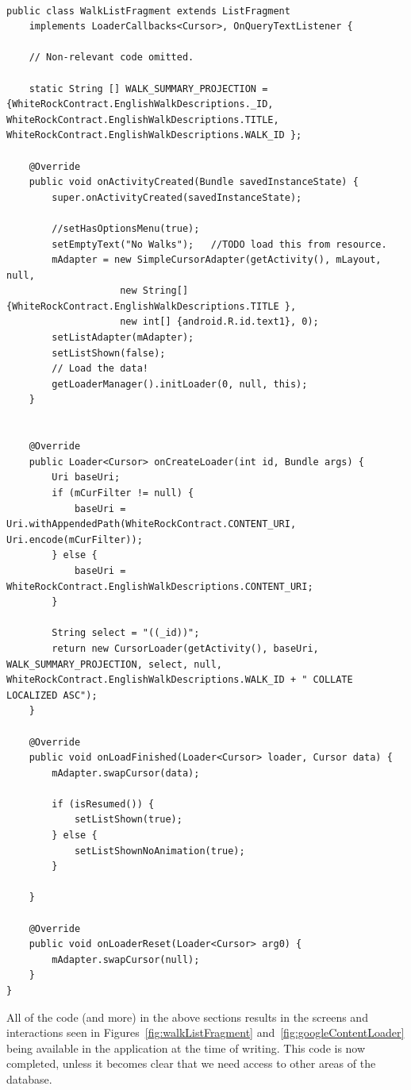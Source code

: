 \documentclass[11pt,a4paper]{article}
\begin{document}
\begin{lstlisting}[captionpos=b, caption=WalkListFragment Snippet, label=lst:walkListFragment, frame=single]

public class WalkListFragment extends ListFragment
	implements LoaderCallbacks<Cursor>, OnQueryTextListener {

	// Non-relevant code omitted.

	static String [] WALK_SUMMARY_PROJECTION = {WhiteRockContract.EnglishWalkDescriptions._ID, WhiteRockContract.EnglishWalkDescriptions.TITLE, WhiteRockContract.EnglishWalkDescriptions.WALK_ID };

	@Override
	public void onActivityCreated(Bundle savedInstanceState) {
		super.onActivityCreated(savedInstanceState);

		//setHasOptionsMenu(true);
		setEmptyText("No Walks");	//TODO load this from resource.
		mAdapter = new SimpleCursorAdapter(getActivity(), mLayout, null,
					new String[] {WhiteRockContract.EnglishWalkDescriptions.TITLE },
					new int[] {android.R.id.text1}, 0);
		setListAdapter(mAdapter);
		setListShown(false);
		// Load the data!
		getLoaderManager().initLoader(0, null, this);
	}


	@Override
	public Loader<Cursor> onCreateLoader(int id, Bundle args) {
		Uri baseUri;
		if (mCurFilter != null) {
			baseUri = Uri.withAppendedPath(WhiteRockContract.CONTENT_URI, Uri.encode(mCurFilter));
		} else {
			baseUri = WhiteRockContract.EnglishWalkDescriptions.CONTENT_URI;
		}

		String select = "((_id))";
		return new CursorLoader(getActivity(), baseUri, WALK_SUMMARY_PROJECTION, select, null, WhiteRockContract.EnglishWalkDescriptions.WALK_ID + " COLLATE LOCALIZED ASC");
	}

	@Override
	public void onLoadFinished(Loader<Cursor> loader, Cursor data) {
		mAdapter.swapCursor(data);

		if (isResumed()) {
			setListShown(true);
		} else {
			setListShownNoAnimation(true);
		}

	}

	@Override
	public void onLoaderReset(Loader<Cursor> arg0) {
		mAdapter.swapCursor(null);
	}
}
\end{lstlisting}

All of the code (and more) in the above sections results in the screens and interactions seen in Figures~\ref{fig:walkListFragment} and~\ref{fig:googleContentLoader} being available in the application at the time of writing. This code is now completed, unless it becomes clear that we need access to other areas of the database.
\end{document}
